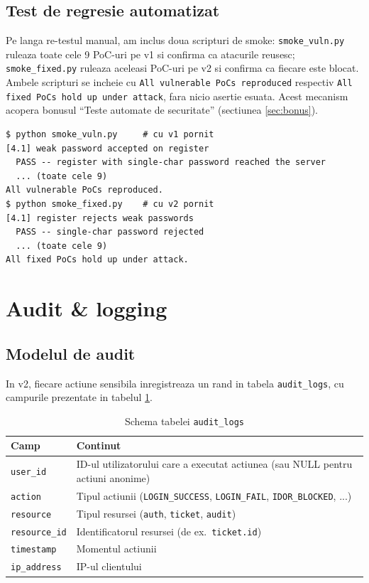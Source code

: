 \documentclass[12pt,a4paper]{article}
\begin{document}
\subsection{Test de regresie automatizat}
Pe langa re-testul manual, am inclus doua scripturi de smoke:
\texttt{smoke\_vuln.py} ruleaza toate cele 9 PoC-uri pe v1 si confirma
ca atacurile reusesc; \texttt{smoke\_fixed.py} ruleaza aceleasi PoC-uri
pe v2 si confirma ca fiecare este blocat. Ambele scripturi se incheie
cu \texttt{All vulnerable PoCs reproduced} respectiv \texttt{All fixed
PoCs hold up under attack}, fara nicio asertie esuata. Acest mecanism
acopera bonusul ``Teste automate de securitate'' (sectiunea \ref{sec:bonus}).

\begin{lstlisting}[style=sh, caption={Rularea scripturilor de smoke}]
$ python smoke_vuln.py     # cu v1 pornit
[4.1] weak password accepted on register
  PASS -- register with single-char password reached the server
  ... (toate cele 9)
All vulnerable PoCs reproduced.
$ python smoke_fixed.py    # cu v2 pornit
[4.1] register rejects weak passwords
  PASS -- single-char password rejected
  ... (toate cele 9)
All fixed PoCs hold up under attack.
\end{lstlisting}

\newpage
\section{Audit \& logging}\label{sec:audit}

\subsection{Modelul de audit}
In v2, fiecare actiune sensibila inregistreaza un rand in tabela
\texttt{audit\_logs}, cu campurile prezentate in tabelul \ref{tab:audit}.

\begin{table}[H]
\centering
\begin{tabular}{ll}
\toprule
\textbf{Camp} & \textbf{Continut} \\
\midrule
\texttt{user\_id}    & ID-ul utilizatorului care a executat actiunea (sau NULL pentru actiuni anonime) \\
\texttt{action}      & Tipul actiunii (\texttt{LOGIN\_SUCCESS}, \texttt{LOGIN\_FAIL}, \texttt{IDOR\_BLOCKED}, ...) \\
\texttt{resource}    & Tipul resursei (\texttt{auth}, \texttt{ticket}, \texttt{audit}) \\
\texttt{resource\_id}& Identificatorul resursei (de ex.\ \texttt{ticket.id}) \\
\texttt{timestamp}   & Momentul actiunii \\
\texttt{ip\_address} & IP-ul clientului \\
\bottomrule
\end{tabular}
\caption{Schema tabelei \texttt{audit\_logs}}
\label{tab:audit}
\end{table}
\end{document}
